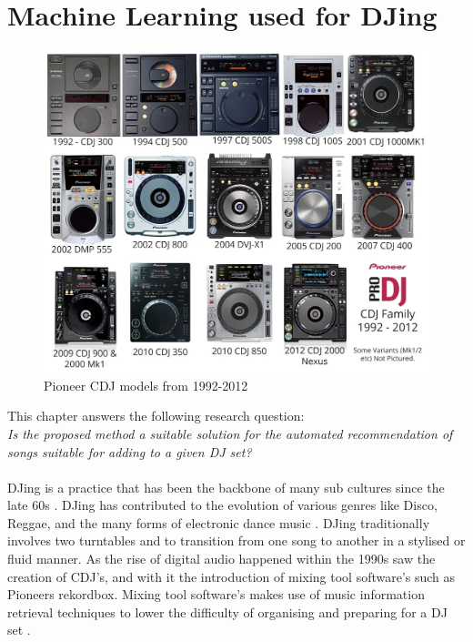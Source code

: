 
\graphicspath{{Chapter3/}}

\chapter{Machine Learning used for DJing}

\begin{figure}[H]
	\includegraphics[scale=0.3]{images/pioneers_history}
	\centering
	\caption{Pioneer CDJ models from 1992-2012 \citep{chesters_history_2017}} 
\end{figure}

This chapter answers the following research question:
\\

\textit{Is the proposed method a suitable solution for the automated recommendation of songs suitable for adding to a given DJ set?} 
\\
\\
DJing is a practice that has been the backbone of many sub cultures since the late 60s \citep{brewster_last_2014}. DJing has contributed to the evolution of various genres like Disco, Reggae, and the many forms of electronic dance music \citep{partridge_dub_2010} \citep{reynolds_energy_2013}. DJing traditionally involves two turntables and to transition from one song to another in a stylised or fluid manner. As the rise of digital audio happened within the 1990s saw the creation of CDJ's, and with it the introduction of mixing tool software's such as Pioneers rekordbox. Mixing tool software's makes use of music information retrieval techniques to lower the difficulty of organising and preparing for a DJ set \citep{kim_automatic_2017}. 


